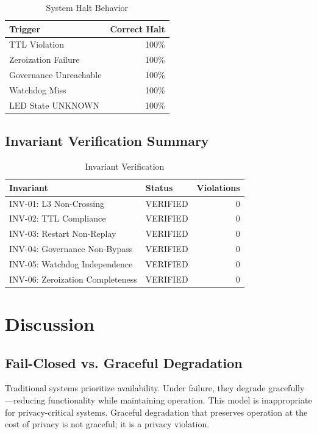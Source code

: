 \documentclass[conference]{IEEEtran}
\begin{document}
\begin{table}[h]
\caption{System Halt Behavior}
\centering
\begin{tabular}{l r}
\toprule
\textbf{Trigger} & \textbf{Correct Halt} \\
\midrule
TTL Violation & 100\% \\
Zeroization Failure & 100\% \\
Governance Unreachable & 100\% \\
Watchdog Miss & 100\% \\
LED State UNKNOWN & 100\% \\
\bottomrule
\end{tabular}
\label{tab:halt}
\end{table}

\subsection{Invariant Verification Summary}

\begin{table}[h]
\caption{Invariant Verification}
\centering
\begin{tabular}{l l r}
\toprule
\textbf{Invariant} & \textbf{Status} & \textbf{Violations} \\
\midrule
INV-01: L3 Non-Crossing & VERIFIED & 0 \\
INV-02: TTL Compliance & VERIFIED & 0 \\
INV-03: Restart Non-Replay & VERIFIED & 0 \\
INV-04: Governance Non-Bypass & VERIFIED & 0 \\
INV-05: Watchdog Independence & VERIFIED & 0 \\
INV-06: Zeroization Completeness & VERIFIED & 0 \\
\bottomrule
\end{tabular}
\label{tab:invariants}
\end{table}

\section{Discussion}

\subsection{Fail-Closed vs. Graceful Degradation}
Traditional systems prioritize availability. Under failure, they degrade gracefully—reducing functionality while maintaining operation. This model is inappropriate for privacy-critical systems. Graceful degradation that preserves operation at the cost of privacy is not graceful; it is a privacy violation.
\end{document}
